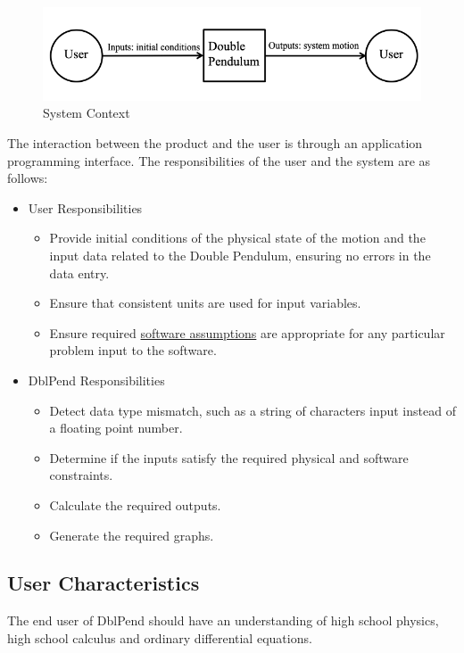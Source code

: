 \documentclass[12pt]{article}
\begin{document}
\begin{figure}
\begin{center}
\includegraphics[width=\textwidth]{../../../../datafiles/dblpend/SystemContextFigure.png}
\caption{System Context}
\label{Figure:sysCtxDiag}
\end{center}
\end{figure}
The interaction between the product and the user is through an application programming interface. The responsibilities of the user and the system are as follows:

\begin{itemize}
\item{User Responsibilities}
\begin{itemize}
\item{Provide initial conditions of the physical state of the motion and the input data related to the Double Pendulum, ensuring no errors in the data entry.}
\item{Ensure that consistent units are used for input variables.}
\item{Ensure required \hyperref[Sec:Assumps]{software assumptions} are appropriate for any particular problem input to the software.}
\end{itemize}
\item{DblPend Responsibilities}
\begin{itemize}
\item{Detect data type mismatch, such as a string of characters input instead of a floating point number.}
\item{Determine if the inputs satisfy the required physical and software constraints.}
\item{Calculate the required outputs.}
\item{Generate the required graphs.}
\end{itemize}
\end{itemize}
\subsection{User Characteristics}
\label{Sec:UserChars}
The end user of DblPend should have an understanding of high school physics, high school calculus and ordinary differential equations.
\end{document}
